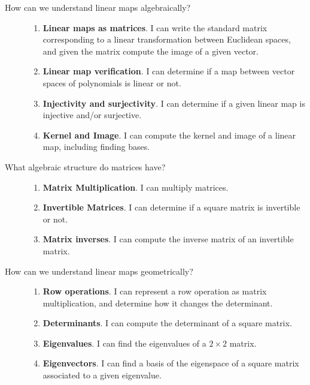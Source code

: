 \begin{description}
\item[How can we understand linear maps algebraically?] \hfill
\begin{enumerate}
\item {\bf Linear maps as matrices}.  I can write the standard matrix corresponding to a linear transformation between Euclidean spaces, and given the matrix compute the image of a given vector.
\item {\bf Linear map verification}. I can determine if a map between vector spaces of polynomials is linear or not.
\item {\bf Injectivity and surjectivity}.  I can determine if a given linear map is injective and/or surjective.
\item {\bf Kernel and Image}. I can compute the kernel and image of a linear map, including finding bases.
\end{enumerate}


\item[What algebraic structure do matrices have?] \hfill
\begin{enumerate}
\item {\bf Matrix Multiplication}. I can multiply matrices.
\item {\bf Invertible Matrices}. I can determine if a square matrix is invertible or not.
\item {\bf Matrix inverses}.  I can compute the inverse matrix of an invertible matrix.
\end{enumerate}


\item[How can we understand linear maps geometrically?] \hfill
\begin{enumerate}
\item {\bf Row operations}.  I can represent a row operation as matrix multiplication, and determine how it changes the determinant.
\item {\bf Determinants}. I can compute the determinant of a square matrix.
\item {\bf Eigenvalues}. I can find the eigenvalues of a $2\times 2$ matrix.
\item {\bf Eigenvectors}. I can find a basis of the eigenspace of a square matrix associated to a given eigenvalue.
\end{enumerate}

\end{description}




